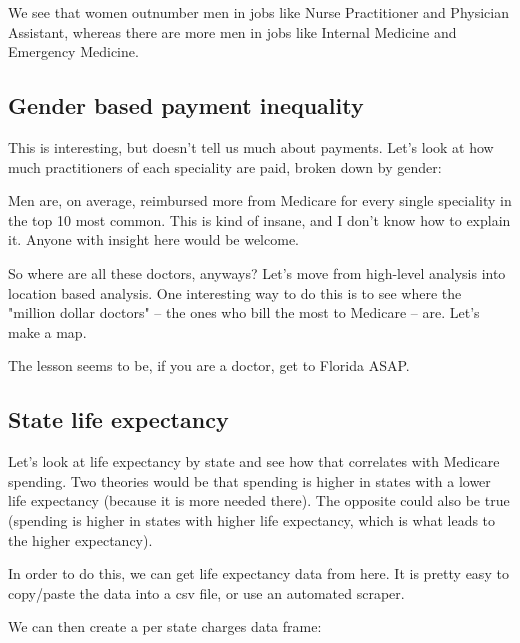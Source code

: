 We see that women outnumber men in jobs like Nurse Practitioner and Physician Assistant, whereas there are more men in jobs like Internal Medicine and Emergency Medicine.

\subsection*{Gender based payment inequality}
This is interesting, but doesn't tell us much about payments. Let's look at how much practitioners of each speciality are paid, broken down by gender:

Men are, on average, reimbursed more from Medicare for every single speciality in the top 10 most common. This is kind of insane, and I don't know how to explain it. Anyone with insight here would be welcome.

So where are all these doctors, anyways?
Let's move from high-level analysis into location based analysis. One interesting way to do this is to see where the "million dollar doctors" -- the ones who bill the most to Medicare -- are. Let's make a map.

The lesson seems to be, if you are a doctor, get to Florida ASAP.

\subsection*{State life expectancy}
Let's look at life expectancy by state and see how that correlates with Medicare spending. Two theories would be that spending is higher in states with a lower life expectancy (because it is more needed there). The opposite could also be true (spending is higher in states with higher life expectancy, which is what leads to the higher expectancy).

In order to do this, we can get life expectancy data from here. It is pretty easy to copy/paste the data into a csv file, or use an automated scraper.

We can then create a per state charges data frame:

